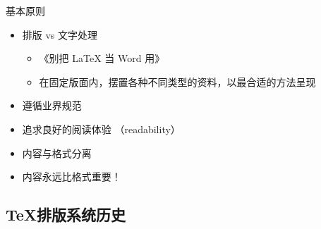 \begin{frame}{基本原则}
  \begin{itemize}
    \item<+-> 排版 vs 文字处理

      \begin{itemize}
        \item 《别把 \LaTeX{} 当 Word 用》
        \item {\scriptsize 在固定版面内，摆置各种不同类型的资料，以最合适的方法呈现 \href{https://zh.wikipedia.org/wiki/排版}{\faWikipediaW}}
      \end{itemize}

    \item<+-> 遵循业界规范
    \item<+-> 追求良好的阅读体验 （readability）
    \item<+-> 内容与格式分离
    \item<+-> \alert{内容永远比格式重要！}
  \end{itemize}
\end{frame}

\subsection{\TeX 排版系统历史}

